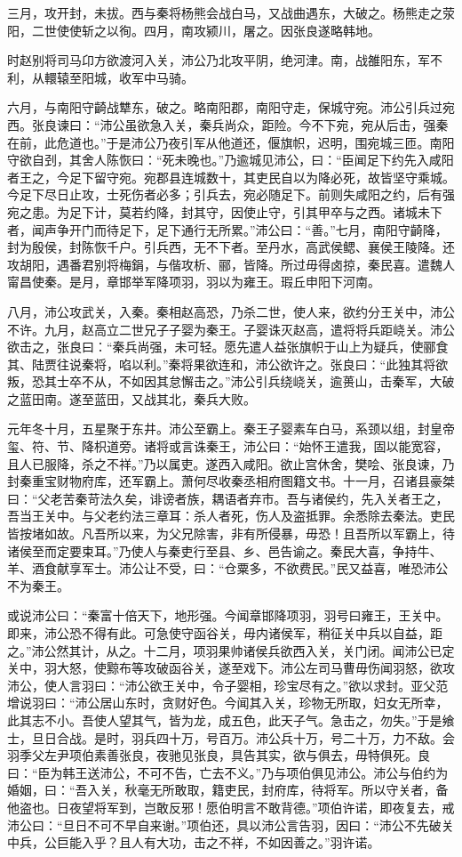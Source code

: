 \documentclass[]{article}
\begin{document}
三月，攻开封，未拔。西与秦将杨熊会战白马，又战曲遇东，大破之。杨熊走之荥阳，二世使使斩之以徇。四月，南攻颍川，屠之。因张良遂略韩地。

时赵别将司马卬方欲渡河入关，沛公乃北攻平阴，绝河津。南，战雒阳东，军不利，从轘辕至阳城，收军中马骑。

六月，与南阳守齮战犨东，破之。略南阳郡，南阳守走，保城守宛。沛公引兵过宛西。张良谏曰：``沛公虽欲急入关，秦兵尚众，距险。今不下宛，宛从后击，强秦在前，此危道也。''于是沛公乃夜引军从他道还，偃旗帜，迟明，围宛城三匝。南阳守欲自刭，其舍人陈恢曰：``死未晚也。''乃逾城见沛公，曰：``臣闻足下约先入咸阳者王之，今足下留守宛。宛郡县连城数十，其吏民自以为降必死，故皆坚守乘城。今足下尽日止攻，士死伤者必多；引兵去，宛必随足下。前则失咸阳之约，后有强宛之患。为足下计，莫若约降，封其守，因使止守，引其甲卒与之西。诸城未下者，闻声争开门而待足下，足下通行无所累。''沛公曰：``善。''七月，南阳守齮降，封为殷侯，封陈恢千户。引兵西，无不下者。至丹水，高武侯鳃、襄侯王陵降。还攻胡阳，遇番君别将梅鋗，与偕攻析、郦，皆降。所过毋得卤掠，秦民喜。遣魏人甯昌使秦。是月，章邯举军降项羽，羽以为雍王。瑕丘申阳下河南。

八月，沛公攻武关，入秦。秦相赵高恐，乃杀二世，使人来，欲约分王关中，沛公不许。九月，赵高立二世兄子子婴为秦王。子婴诛灭赵高，遣将将兵距峣关。沛公欲击之，张良曰：``秦兵尚强，未可轻。愿先遣人益张旗帜于山上为疑兵，使郦食其、陆贾往说秦将，啗以利。''秦将果欲连和，沛公欲许之。张良曰：``此独其将欲叛，恐其士卒不从，不如因其怠懈击之。''沛公引兵绕峣关，逾蒉山，击秦军，大破之蓝田南。遂至蓝田，又战其北，秦兵大败。

元年冬十月，五星聚于东井。沛公至霸上。秦王子婴素车白马，系颈以组，封皇帝玺、符、节、降枳道旁。诸将或言诛秦王，沛公曰：``始怀王遣我，固以能宽容，且人已服降，杀之不祥。''乃以属吏。遂西入咸阳。欲止宫休舍，樊哙、张良谏，乃封秦重宝财物府库，还军霸上。萧何尽收秦丞相府图籍文书。十一月，召诸县豪桀曰：``父老苦秦苛法久矣，诽谤者族，耦语者弃市。吾与诸侯约，先入关者王之，吾当王关中。与父老约法三章耳：杀人者死，伤人及盗抵罪。余悉除去秦法。吏民皆按堵如故。凡吾所以来，为父兄除害，非有所侵暴，毋恐！且吾所以军霸上，待诸侯至而定要束耳。''乃使人与秦吏行至县、乡、邑告谕之。秦民大喜，争持牛、羊、酒食献享军士。沛公让不受，曰：``仓粟多，不欲费民。''民又益喜，唯恐沛公不为秦王。

或说沛公曰：``秦富十倍天下，地形强。今闻章邯降项羽，羽号曰雍王，王关中。即来，沛公恐不得有此。可急使守函谷关，毋内诸侯军，稍征关中兵以自益，距之。''沛公然其计，从之。十二月，项羽果帅诸侯兵欲西入关，关门闭。闻沛公已定关中，羽大怒，使黥布等攻破函谷关，遂至戏下。沛公左司马曹毋伤闻羽怒，欲攻沛公，使人言羽曰：``沛公欲王关中，令子婴相，珍宝尽有之。''欲以求封。亚父范增说羽曰：``沛公居山东时，贪财好色。今闻其入关，珍物无所取，妇女无所幸，此其志不小。吾使人望其气，皆为龙，成五色，此天子气。急击之，勿失。''于是飨士，旦日合战。是时，羽兵四十万，号百万。沛公兵十万，号二十万，力不敌。会羽季父左尹项伯素善张良，夜驰见张良，具告其实，欲与俱去，毋特俱死。良曰：``臣为韩王送沛公，不可不告，亡去不义。''乃与项伯俱见沛公。沛公与伯约为婚姻，曰：``吾入关，秋毫无所敢取，籍吏民，封府库，待将军。所以守关者，备他盗也。日夜望将军到，岂敢反邪！愿伯明言不敢背德。''项伯许诺，即夜复去，戒沛公曰：``旦日不可不早自来谢。''项伯还，具以沛公言告羽，因曰：``沛公不先破关中兵，公巨能入乎？且人有大功，击之不祥，不如因善之。''羽许诺。
\end{document}
